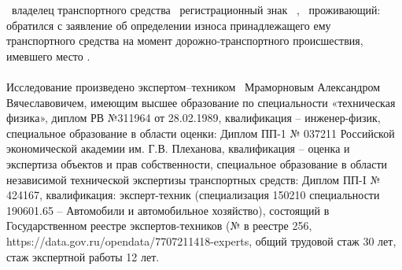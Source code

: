 

\vspace{2mm}
\noindent \dog\, владелец транспортного средства \, регистрационный знак  \,  , \, проживающий:  \, обратился с заявление об определении износа принадлежащего ему транспортного средства на момент дорожно-транспортного происшествия, имевшего место . %





\paragraph*{}
Исследование произведено  экспертом--техником
\,  Мраморновым Александром Вячеславовичем, имеющим высшее  образование по специальности «техническая физика», диплом РВ №311964 от 28.02.1989, квалификация -- инженер-физик, специальное образование в области оценки: Диплом ПП-1 № 037211 Российской экономической академии им. Г.В. Плеханова, квалификация -- оценка и экспертиза объектов и прав собственности, специальное образование в области независимой технической экспертизы транспортных средств: Диплом ПП-I № 424167, квалификация: эксперт-техник (специализация 150210 специальности 190601.65 – Автомобили и автомобильное хозяйство), состоящий в Государственном реестре экспертов-техников (№ в реестре 256, https://data.gov.ru/opendata/7707211418-experts,  общий трудовой  стаж 30 лет, стаж  экспертной работы  12 лет. 
\vspace{4mm}